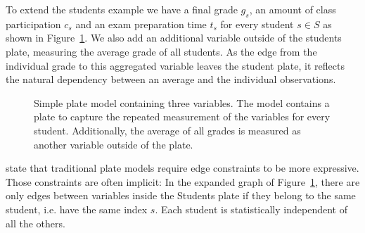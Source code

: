 To extend the students example we have a final grade $g_s$, an amount of class participation $c_s$ and an exam preparation time $t_s$ for every student $s \in S$ as shown in Figure~\ref{fig:simple_platemodel}. We also add an additional variable outside of the students plate, measuring the average grade of all students. As the edge from the individual grade to this aggregated variable leaves the student plate, it reflects the natural dependency between an average and the individual observations.

\begin{figure}[t]
	\begin{center}
    	\scalebox{\tikzScale}{\adjustTikzSize }
	\end{center}
\caption[Simple plate model containing three variables.]{Simple plate model containing three variables. The model contains a plate to capture the repeated measurement of the variables for every student. Additionally, the average of all grades is measured as another variable outside of the plate.}
		\label{fig:simple_platemodel}
\end{figure}

\textcite{heckerman2007probabilistic} state that traditional plate models require edge constraints to be more expressive. Those constraints are often implicit: In the expanded graph of Figure~\ref{fig:simple_platemodel}, there are only edges between variables inside the Students plate if they belong to the same student, i.e. have the same index $s$. Each student is statistically independent of all the others.

